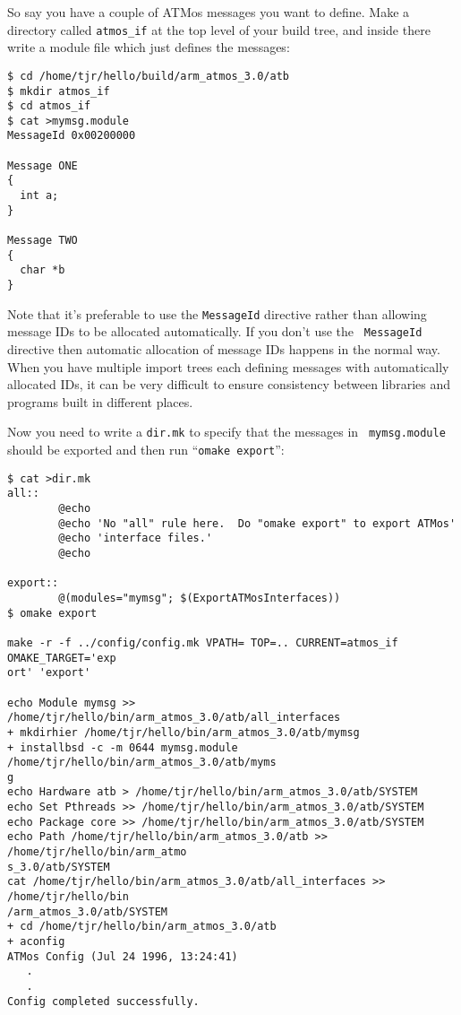 \documentclass[11pt,twoside,onecolumn]{article}
\begin{document}
So say you have a couple of ATMos messages you want to define.  Make a
directory called \verb|atmos_if| at the top level of your build tree, and
inside there write a module file which just defines the messages:

{\small \begin{verbatim}
$ cd /home/tjr/hello/build/arm_atmos_3.0/atb
$ mkdir atmos_if
$ cd atmos_if
$ cat >mymsg.module
MessageId 0x00200000

Message ONE
{
  int a;
}

Message TWO
{
  char *b
}
\end{verbatim}}

Note that it's preferable to use the {\tt MessageId} directive rather than
allowing message IDs to be allocated automatically.  If you don't use the {\tt
MessageId} directive then automatic allocation of message IDs happens in the
normal way.  When you have multiple import trees each defining messages with
automatically allocated IDs, it can be very difficult to ensure consistency
between libraries and programs built in different places.

Now you need to write a {\tt dir.mk} to specify that the messages in {\tt
mymsg.module} should be exported and then run ``{\tt omake export}'':

{\small \begin{verbatim}
$ cat >dir.mk
all::
        @echo
        @echo 'No "all" rule here.  Do "omake export" to export ATMos'
        @echo 'interface files.'
        @echo

export::
        @(modules="mymsg"; $(ExportATMosInterfaces))
$ omake export

make -r -f ../config/config.mk VPATH= TOP=.. CURRENT=atmos_if OMAKE_TARGET='exp
ort' 'export'

echo Module mymsg >> /home/tjr/hello/bin/arm_atmos_3.0/atb/all_interfaces
+ mkdirhier /home/tjr/hello/bin/arm_atmos_3.0/atb/mymsg 
+ installbsd -c -m 0644 mymsg.module /home/tjr/hello/bin/arm_atmos_3.0/atb/myms
g 
echo Hardware atb > /home/tjr/hello/bin/arm_atmos_3.0/atb/SYSTEM
echo Set Pthreads >> /home/tjr/hello/bin/arm_atmos_3.0/atb/SYSTEM
echo Package core >> /home/tjr/hello/bin/arm_atmos_3.0/atb/SYSTEM
echo Path /home/tjr/hello/bin/arm_atmos_3.0/atb >> /home/tjr/hello/bin/arm_atmo
s_3.0/atb/SYSTEM
cat /home/tjr/hello/bin/arm_atmos_3.0/atb/all_interfaces >> /home/tjr/hello/bin
/arm_atmos_3.0/atb/SYSTEM
+ cd /home/tjr/hello/bin/arm_atmos_3.0/atb 
+ aconfig 
ATMos Config (Jul 24 1996, 13:24:41)
   .
   .
Config completed successfully.
\end{verbatim}}
\end{document}
